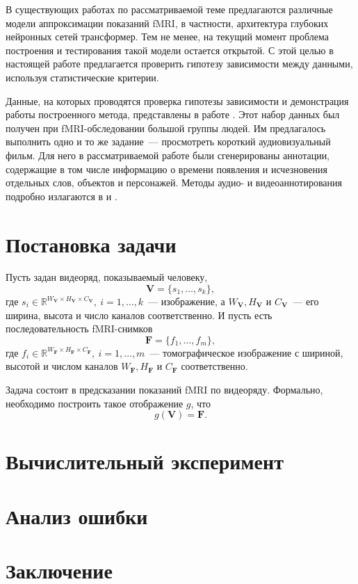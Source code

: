 \documentclass[a4paper, 12pt]{article}
\begin{document}
	В существующих работах по рассматриваемой теме предлагаются различные модели аппроксимации 
	показаний fMRI, в частности, архитектура глубоких нейронных сетей трансформер. Тем не менее,
	на текущий момент проблема построения и тестирования такой модели остается открытой.
	С этой целью в настоящей работе предлагается проверить гипотезу зависимости между данными, 
	используя статистические критерии.

	Данные, на которых проводятся проверка гипотезы зависимости и демонстрация работы построенного 
	метода, представлены в работе \citep{Berezutskaya2022}. Этот набор данных был получен при
	fMRI-обследовании большой группы людей. Им предлагалось выполнить одно и то же задание~---
	просмотреть короткий аудиовизуальный фильм. Для него в рассматриваемой работе были 
	сгенерированы аннотации, содержащие в том числе информацию о времени появления и исчезновения
	отдельных слов, объектов и персонажей. Методы аудио- и видеоаннотирования подробно излагаются в
	\citep{boersma2018praat} и \citep{Berezutskaya2020}. 

\section{Постановка задачи}

	Пусть задан видеоряд, показываемый человеку,
	\begin{equation}
		\mathbf{V} = \{s_1, \ldots, s_k\},
	\end{equation}
	где $s_i \in \mathbb{R}^{W_{\mathbf{V}} \times H_{\mathbf{V}} \times C_{\mathbf{V}}},
	\ i = 1, \ldots, k$~--- изображение, а $W_{\mathbf{V}}, H_{\mathbf{V}}$ и 
	$C_{\mathbf{V}}$~--- его ширина, высота и число каналов соответственно.
	И пусть есть последовательность fMRI-снимков
	\begin{equation}
		\mathbf{F} = \{f_1, \ldots, f_m\},
	\end{equation}
	где $f_i \in \mathbb{R}^{W_{\mathbf{F}} \times H_{\mathbf{F}} \times C_{\mathbf{F}}},
	\ i = 1, \ldots, m$~--- томографическое изображение с шириной, высотой и числом каналов
	$W_{\mathbf{F}}, H_{\mathbf{F}}$ и $C_{\mathbf{F}}$ соответственно.


	Задача состоит в предсказании показаний fMRI по видеоряду. Формально, необходимо построить
	такое отображение $g$, что
	\begin{equation}
		g(\mathbf{V}) = \mathbf{F}.
	\end{equation}

\section{Вычислительный эксперимент}

\section{Анализ ошибки}

\section{Заключение}



\end{document}
